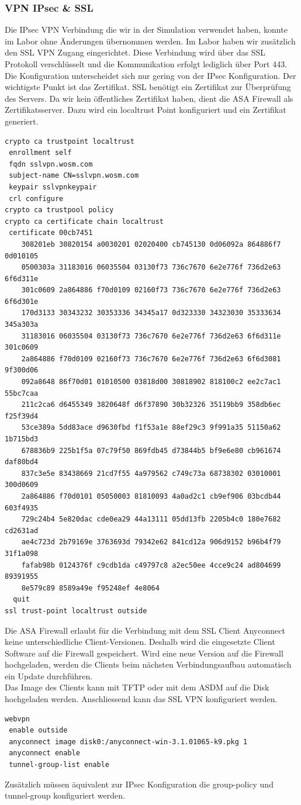 \documentclass[11pt,a4paper,parskip=half]{scrartcl}
\begin{document}
\subsubsection{VPN IPsec \& SSL}
Die IPsec VPN Verbindung die wir in der Simulation verwendet haben, konnte im Labor ohne Änderungen übernommen werden. Im Labor haben wir zusätzlich den SSL VPN Zugang eingerichtet. Diese Verbindung wird über das SSL Protokoll verschlüsselt und die Kommunikation erfolgt lediglich über Port 443. Die Konfiguration unterscheidet sich nur gering von der IPsec Konfiguration. Der wichtigste Punkt ist das Zertifikat. SSL benötigt ein Zertifikat zur Überprüfung des Servers. Da wir kein öffentliches Zertifikat haben, dient die ASA Firewall als Zertifikatsserver. Dazu wird ein localtrust Point konfiguriert und ein Zertifikat generiert.
\begin{lstlisting}
crypto ca trustpoint localtrust
 enrollment self
 fqdn sslvpn.wosm.com
 subject-name CN=sslvpn.wosm.com
 keypair sslvpnkeypair
 crl configure
crypto ca trustpool policy
crypto ca certificate chain localtrust
 certificate 00cb7451
    308201eb 30820154 a0030201 02020400 cb745130 0d06092a 864886f7 0d010105
    0500303a 31183016 06035504 03130f73 736c7670 6e2e776f 736d2e63 6f6d311e
    301c0609 2a864886 f70d0109 02160f73 736c7670 6e2e776f 736d2e63 6f6d301e
    170d3133 30343232 30353336 34345a17 0d323330 34323030 35333634 345a303a
    31183016 06035504 03130f73 736c7670 6e2e776f 736d2e63 6f6d311e 301c0609
    2a864886 f70d0109 02160f73 736c7670 6e2e776f 736d2e63 6f6d3081 9f300d06
    092a8648 86f70d01 01010500 03818d00 30818902 818100c2 ee2c7ac1 55bc7caa
    211c2ca6 d6455349 3820648f d6f37890 30b32326 35119bb9 358db6ec f25f39d4
    53ce389a 5dd83ace d9630fbd f1f53a1e 88ef29c3 9f991a35 51150a62 1b715bd3
    678836b9 225b1f5a 07c79f50 869fdb45 d73844b5 bf9e6e80 cb961674 daf80bd4
    837c3e5e 83438669 21cd7f55 4a979562 c749c73a 68738302 03010001 300d0609
    2a864886 f70d0101 05050003 81810093 4a0ad2c1 cb9ef906 03bcdb44 603f4935
    729c24b4 5e820dac cde0ea29 44a13111 05dd13fb 2205b4c0 180e7682 cd2631ad
    ae4c723d 2b79169e 3763693d 79342e62 841cd12a 906d9152 b96b4f79 31f1a098
    fafab98b 0124376f c9cdb1da c49797c8 a2ec50ee 4cce9c24 ad804699 89391955
    8e579c89 8589a49e f95248ef 4e8064
  quit
ssl trust-point localtrust outside
\end{lstlisting}

Die ASA Firewall erlaubt für die Verbindung mit dem SSL Client Anyconnect keine unterschiedliche Client-Versionen. Deshalb wird die eingesetzte Client Software auf die Firewall gespeichert. Wird eine neue Version auf die Firewall hochgeladen, werden die Clients beim nächsten Verbindungsaufbau automatisch ein Update durchführen.\\
Das Image des Clients kann mit TFTP oder mit dem ASDM auf die Disk hochgeladen werden. Anschliessend kann das SSL VPN konfiguriert werden.
\begin{lstlisting}
webvpn
 enable outside
 anyconnect image disk0:/anyconnect-win-3.1.01065-k9.pkg 1
 anyconnect enable
 tunnel-group-list enable
\end{lstlisting}
Zusätzlich müssen äquivalent zur IPsec Konfiguration die group-policy und tunnel-group konfiguriert werden. 
\end{document}
